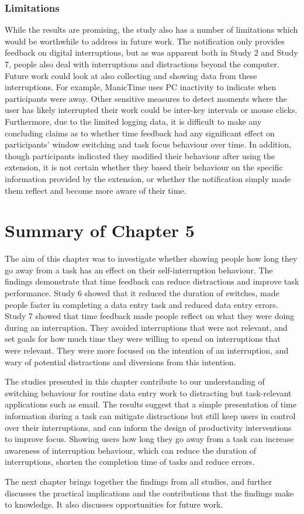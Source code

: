 \subsubsection{Limitations}
While the results are promising, the study also has a number of limitations which would be worthwhile to address in future work. The notification only provides feedback on digital interruptions, but as was apparent both in Study 2 and Study 7, people also deal with interruptions and distractions beyond the computer. Future work could look at also collecting and showing data from these interruptions. For example, ManicTime uses PC inactivity to indicate when participants were away. Other sensitive measures to detect moments where the user has likely interrupted their work could be inter-key intervals or mouse clicks. Furthermore, due to the limited logging data, it is difficult to make any concluding claims as to whether time feedback had any significant effect on participants’ window switching and task focus behaviour over time. In addition, though participants indicated they modified their behaviour after using the extension, it is not certain whether they based their behaviour on the specific information provided by the extension, or whether the notification simply made them reflect and become more aware of their time. 

\section{Summary of Chapter 5}
The aim of this chapter was to investigate whether showing people how long they go away from a task has an effect on their self-interruption behaviour. The findings demonstrate that time feedback can reduce distractions and improve task performance. Study 6 showed that it reduced the duration of switches, made people faster in completing a data entry task and reduced data entry errors. Study 7 showed that time feedback made people reflect on what they were doing during an interruption. They avoided interruptions that were not relevant, and set goals for how much time they were willing to spend on interruptions that were relevant. They were more focused on the intention of an interruption, and wary of potential distractions and diversions from this intention. 

The studies presented in this chapter contribute to our understanding of switching behaviour for routine data entry work to distracting but task-relevant applications such as email. The results suggest that a simple presentation of time information during a task can mitigate distractions but still keep users in control over their interruptions, and can inform the design of productivity interventions to improve focus. Showing users how long they go away from a task can increase awareness of interruption behaviour, which can reduce the duration of interruptions, shorten the completion time of tasks and reduce errors.

The next chapter brings together the findings from all studies, and further discusses the practical implications and the contributions that the findings make to knowledge. It also discusses opportunities for future work.
